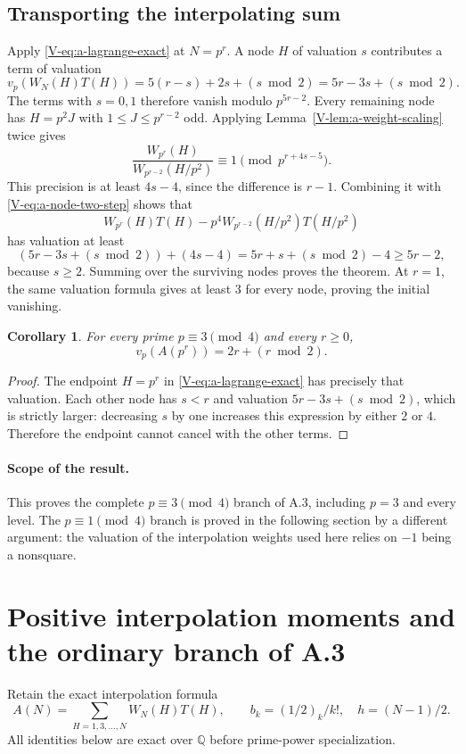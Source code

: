 \documentclass[11pt,letterpaper]{article}
\newtheorem{corollary}[theorem]{Corollary}
\numberwithin{equation}{section}
\begin{document}
\subsection{Transporting the interpolating sum}
Apply \eqref{V-eq:a-lagrange-exact} at $N=p^r$. A node $H$ of valuation
$s$ contributes a term of valuation
\[
 v_p(W_N(H)T(H))=5(r-s)+2s+(s\bmod2)
 =5r-3s+(s\bmod2).
\]
The terms with $s=0,1$ therefore vanish modulo $p^{5r-2}$. Every
remaining node has $H=p^2J$ with $1\le J\le p^{r-2}$ odd. Applying
Lemma~\ref{V-lem:a-weight-scaling} twice gives
\[
 \frac{W_{p^r}(H)}{W_{p^{r-2}}(H/p^2)}
 \equiv1\pmod{p^{r+4s-5}}.
\]
This precision is at least $4s-4$, since the difference is $r-1$. Combining it with
\eqref{V-eq:a-node-two-step} shows that
\[
 W_{p^r}(H)T(H)-p^4W_{p^{r-2}}(H/p^2)T(H/p^2)
\]
has valuation at least
\[
 (5r-3s+(s\bmod2))+(4s-4)
 =5r+s+(s\bmod2)-4\ge5r-2,
\]
because $s\ge2$. Summing over the surviving nodes proves the theorem.
At $r=1$, the same valuation formula gives at least $3$ for every
node, proving the initial vanishing.

\begin{corollary}
For every prime $p\equiv3\pmod4$ and every $r\ge0$,
\[
 v_p(A(p^r))=2r+(r\bmod2).
\]
\end{corollary}
\begin{proof}
The endpoint $H=p^r$ in \eqref{V-eq:a-lagrange-exact} has precisely
that valuation. Each other node has $s<r$ and valuation
$5r-3s+(s\bmod2)$, which is strictly larger: decreasing $s$ by
one increases this expression by either $2$ or $4$. Therefore the
endpoint cannot cancel with the other terms.
\end{proof}

\paragraph{Scope of the result.}
This proves the complete $p\equiv3\pmod4$ branch of A.3, including
$p=3$ and every level. The $p\equiv1\pmod4$ branch is proved in the
following section by a different argument: the valuation of the
interpolation weights used here relies on $-1$ being a nonsquare.

\section{Positive interpolation moments and the ordinary branch of A.3}\label{loc-V-3}
Retain the exact interpolation formula
\[
A(N)=\sum_{H=1,3,\ldots,N}W_N(H)T(H),\qquad
b_k=(1/2)_k/k!,\quad h=(N-1)/2.
\]
All identities below are exact over $\mathbb Q$ before prime-power
specialization.
\end{document}
